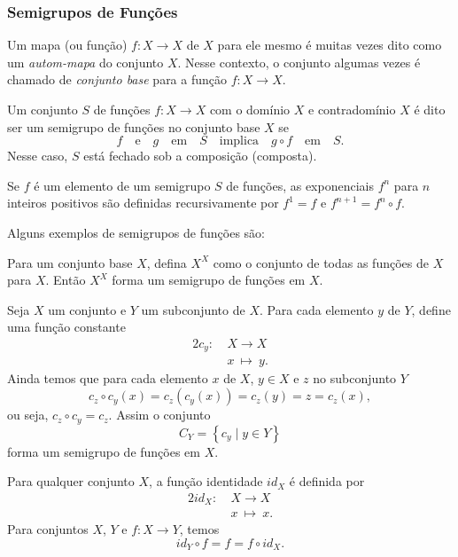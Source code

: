       \subsubsection{Semigrupos de Funções}
         Um mapa (ou função) $f: X \to X$ de $X$ para ele mesmo é muitas vezes dito como um \emph{autom-mapa} do conjunto $X$. Nesse contexto, o conjunto algumas vezes é chamado de \emph{conjunto base} para a função $f: X \to X$.
         \begin{definition}
            Um conjunto $S$ de funções $f: X \to X$ com o domínio $X$ e contradomínio $X$ é dito ser um semigrupo de funções no conjunto base $X$ se $$f\quad \textrm{e}\quad g\quad \textrm{em}\quad S\quad \textrm{implica}\quad g \circ f\quad \textrm{em}\quad S. $$
            Nesse caso, $S$ está fechado sob a composição (composta).

            Se $f$ é um elemento de um semigrupo $S$ de funções, as exponenciais $f^n$ para $n$ inteiros positivos são definidas recursivamente por $f^{1} = f$ e $f^{n+1} = f^n \circ f.$

            Alguns exemplos de semigrupos de funções são:
            \begin{exmp}
               Para um conjunto base $X$, defina $X^X$ como o conjunto de todas as funções de $X$ para $X$. Então $X^X$ forma um semigrupo de funções em $X$.
            \end{exmp}
         \end{definition}
         \begin{exmp}
            Seja $X$ um conjunto e $Y$ um subconjunto de $X$. Para cada elemento $y$ de $Y$, define uma função constante
            \begin{alignat}{2}
               c_{y}:\ &X \to X \nonumber\\
               &x\ \mapsto\ y.
               \nonumber
            \end{alignat}
            Ainda temos que para cada elemento $x$ de $X$, $y \in X$ e $z$ no subconjunto $Y$
            $$c_{z} \circ c_{y}(x) = c_{z}\left(c_{y}(x)\right) = c_{z}(y) = z = c_{z}(x),$$
            ou seja, $c_{z} \circ c_{y} = c_{z}$. Assim o conjunto $$C_{Y} = \left\{c_{y}\mid y \in Y\right\}$$ forma um semigrupo de funções em $X$.
         \end{exmp}
         \begin{definition}
            Para qualquer conjunto $X$, a função identidade $id_{X}$ é definida por
            \begin{alignat}{2}
               id_{X}:\ &X \to X \nonumber\\
               &x\ \mapsto\ x.
               \nonumber
            \end{alignat}
            Para conjuntos $X$, $Y$ e $f: X \to Y$, temos
            $$id_{Y}\circ f = f = f \circ id_{X}.$$
         \end{definition}
